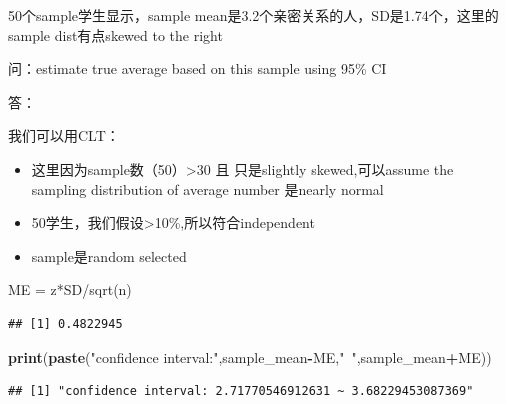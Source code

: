 \documentclass[]{book}
\newenvironment{Shaded}{\begin{snugshade}}{\end{snugshade}}
\newcommand{\KeywordTok}[1]{\textcolor[rgb]{0.13,0.29,0.53}{\textbf{#1}}}
\newcommand{\DecValTok}[1]{\textcolor[rgb]{0.00,0.00,0.81}{#1}}
\newcommand{\FloatTok}[1]{\textcolor[rgb]{0.00,0.00,0.81}{#1}}
\newcommand{\StringTok}[1]{\textcolor[rgb]{0.31,0.60,0.02}{#1}}
\newcommand{\CommentTok}[1]{\textcolor[rgb]{0.56,0.35,0.01}{\textit{#1}}}
\newcommand{\OperatorTok}[1]{\textcolor[rgb]{0.81,0.36,0.00}{\textbf{#1}}}
\newcommand{\NormalTok}[1]{#1}
\providecommand{\tightlist}{%
  \setlength{\itemsep}{0pt}\setlength{\parskip}{0pt}}
\begin{document}
50个sample学生显示，sample
mean是3.2个亲密关系的人，SD是1.74个，这里的sample dist有点skewed to the
right

问：estimate true average based on this sample using 95\% CI

答：

我们可以用CLT：

\begin{itemize}
\tightlist
\item
  这里因为sample数（50）\textgreater{}30 且 只是slightly
  skewed,可以assume the sampling distribution of average number 是nearly
  normal
\item
  50学生，我们假设\textgreater{}10\%,所以符合independent
\item
  sample是random selected
\end{itemize}

ME = z*SD/sqrt(n)

\begin{Shaded}
\end{Shaded}

\begin{verbatim}
## [1] 0.4822945
\end{verbatim}

\begin{Shaded}
\begin{Highlighting}[]
\KeywordTok{print}\NormalTok{(}\KeywordTok{paste}\NormalTok{(}\StringTok{"confidence interval:"}\NormalTok{,sample_mean}\OperatorTok{-}\NormalTok{ME,}\StringTok{"~"}\NormalTok{,sample_mean}\OperatorTok{+}\NormalTok{ME))}
\end{Highlighting}
\end{Shaded}

\begin{verbatim}
## [1] "confidence interval: 2.71770546912631 ~ 3.68229453087369"
\end{verbatim}
\end{document}
